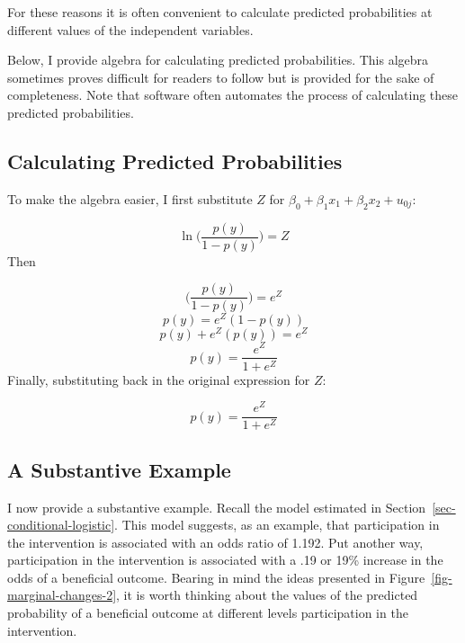 \documentclass[
  letterpaper,
  DIV=11,
  numbers=noendperiod]{scrreprt}
\begin{document}
For these reasons it is often convenient to calculate predicted
probabilities at different values of the independent variables.

\begin{tcolorbox}[enhanced jigsaw, bottomtitle=1mm, breakable, bottomrule=.15mm, colbacktitle=quarto-callout-tip-color!10!white, opacityback=0, colback=white, arc=.35mm, coltitle=black, rightrule=.15mm, leftrule=.75mm, titlerule=0mm, toprule=.15mm, colframe=quarto-callout-tip-color-frame, toptitle=1mm, title=\textcolor{quarto-callout-tip-color}{\faLightbulb}\hspace{0.5em}{The Algebra May Be Helpful}, left=2mm, opacitybacktitle=0.6]

Below, I provide algebra for calculating predicted probabilities. This
algebra sometimes proves difficult for readers to follow but is provided
for the sake of completeness. Note that software often automates the
process of calculating these predicted probabilities.

\end{tcolorbox}

\subsection{Calculating Predicted
Probabilities}\label{calculating-predicted-probabilities}

To make the algebra easier, I first substitute \(Z\) for
\(\beta_0 + \beta_1 x_1 + \beta_2 x_2 + u_{0j}\):

\[\ln\Big(\frac{p(y)}{1-p(y)}\Big) = Z\] Then

\[\Big(\frac{p(y)}{1-p(y)}\Big) = e^Z\] \[p(y) = e^Z(1-p(y))\]
\[p(y) + e^Z(p(y)) = e^Z\] \[p(y) = \frac{e^Z}{1+e^Z}\] Finally,
substituting back in the original expression for \(Z\):

\[p(y) = \frac{e^Z}{1+e^Z}\]

\subsection{A Substantive Example}\label{a-substantive-example}

I now provide a substantive example. Recall the model estimated in
Section~\ref{sec-conditional-logistic}. This model suggests, as an
example, that participation in the intervention is associated with an
odds ratio of 1.192. Put another way, participation in the intervention
is associated with a .19 or 19\% increase in the odds of a beneficial
outcome. Bearing in mind the ideas presented in
Figure~\ref{fig-marginal-changes-2}, it is worth thinking about the
values of the predicted probability of a beneficial outcome at different
levels participation in the intervention.
\end{document}
